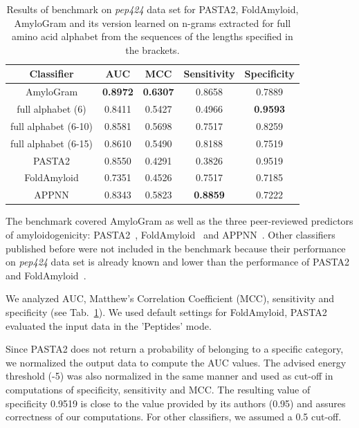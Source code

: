 \documentclass[fleqn,10pt,twoside]{gcb15submission}
\begin{document}
\begin{table}[ht]
\centering
\small
\caption{Results of benchmark on \textit{pep424} data set for PASTA2, 
FoldAmyloid, AmyloGram and its version learned on n-grams extracted for full amino acid alphabet from the sequences of the lengths specified in 
the brackets.} 
\label{tab:bench_summary}
\begin{tabular}{ccccc}
  \toprule
Classifier & AUC & MCC & Sensitivity & Specificity \\ 
  \midrule
AmyloGram & \textbf{0.8972} & \textbf{0.6307} & 0.8658 & 0.7889 \\ 
   \rowcolor[gray]{0.85}full alphabet (6) & 0.8411 & 0.5427 & 0.4966 & 
\textbf{0.9593} \\ 
  full alphabet (6-10) & 0.8581 & 0.5698 & 0.7517 & 0.8259 \\ 
   \rowcolor[gray]{0.85}full alphabet (6-15) & 0.8610 & 0.5490 & 0.8188 & 
0.7519 \\ 
\hline \hline
  PASTA2 & 0.8550 & 0.4291 & 0.3826 & 0.9519 \\ 
   \rowcolor[gray]{0.85}FoldAmyloid & 0.7351 & 0.4526 & 0.7517 & 0.7185 \\ 
  APPNN & 0.8343 & 0.5823 & \textbf{0.8859} & 0.7222 \\ 
   \bottomrule
\end{tabular}
\end{table}

The benchmark covered AmyloGram as well as the three peer-reviewed predictors of 
amyloidogenicity: PASTA2~\citep{walsh_pasta_2014}, 
FoldAmyloid~\citep{garbuzynskiy_foldamyloid:_2010} and 
APPNN~\citep{familia_prediction_2015}. Other classifiers published before were 
not included in the benchmark because their performance on \textit{pep424} 
data set is already known and lower than the performance of PASTA2 and 
FoldAmyloid~\citep{walsh_pasta_2014}.

  We analyzed AUC, Matthew's Correlation Coefficient 
%
%
%
(MCC), sensitivity and specificity (see Tab.~\ref{tab:bench_summary}). We used 
default settings for FoldAmyloid, PASTA2 evaluated the input data in the 
'Peptides' mode.

  Since PASTA2 does not return a probability of belonging to a specific category, 
we normalized the output data to compute the AUC values. The advised energy 
threshold (-5) was also normalized in the same manner and used as cut-off in 
computations of specificity, sensitivity and MCC. The resulting value of 
specificity 0.9519 is close to the value provided by its authors (0.95) and assures 
correctness of our computations. For other classifiers, we assumed a 0.5 cut-off.
    
\end{document}
